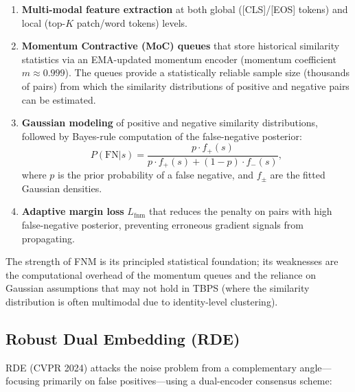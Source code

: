 \documentclass[../main.tex]{subfiles}
\begin{document}
\begin{enumerate}
    \item \textbf{Multi-modal feature extraction} at both global ([CLS]/[EOS] tokens) and local (top-$K$ patch/word tokens) levels.
    \item \textbf{Momentum Contractive (MoC) queues} that store historical similarity statistics via an EMA-updated momentum encoder (momentum coefficient $m \approx 0.999$). The queues provide a statistically reliable sample size (thousands of pairs) from which the similarity distributions of positive and negative pairs can be estimated.
    \item \textbf{Gaussian modeling} of positive and negative similarity distributions, followed by Bayes-rule computation of the false-negative posterior:
    \[
    P(\text{FN} | s) = \frac{p \cdot f_{+}(s)}{p \cdot f_{+}(s) + (1-p) \cdot f_{-}(s)},
    \]
    where $p$ is the prior probability of a false negative, and $f_{\pm}$ are the fitted Gaussian densities.
    \item \textbf{Adaptive margin loss} $L_{\text{fnm}}$ that reduces the penalty on pairs with high false-negative posterior, preventing erroneous gradient signals from propagating.
\end{enumerate}

\noindent The strength of FNM is its principled statistical foundation; its weaknesses are the computational overhead of the momentum queues and the reliance on Gaussian assumptions that may not hold in TBPS (where the similarity distribution is often multimodal due to identity-level clustering).

\subsection{Robust Dual Embedding (RDE)}

\noindent RDE (CVPR 2024) attacks the noise problem from a complementary angle---focusing primarily on false positives---using a dual-encoder consensus scheme:
\end{document}
